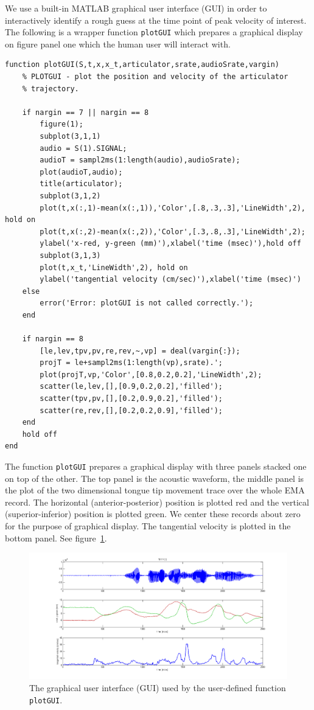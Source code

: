 \documentclass[a4paper, 12pt]{article}
\begin{document}
We use a built-in MATLAB graphical user interface (GUI) in order to interactively identify a rough guess at the time point of peak velocity of interest. The following is a wrapper function \texttt{plotGUI} which prepares a graphical display on figure panel one which the human user will interact with.
\begin{verbatim}
function plotGUI(S,t,x,x_t,articulator,srate,audioSrate,vargin)
    % PLOTGUI - plot the position and velocity of the articulator
    % trajectory.
    
    if nargin == 7 || nargin == 8
        figure(1);
        subplot(3,1,1)
        audio = S(1).SIGNAL;
        audioT = sampl2ms(1:length(audio),audioSrate);
        plot(audioT,audio);
        title(articulator); 
        subplot(3,1,2)
        plot(t,x(:,1)-mean(x(:,1)),'Color',[.8,.3,.3],'LineWidth',2), hold on
        plot(t,x(:,2)-mean(x(:,2)),'Color',[.3,.8,.3],'LineWidth',2);
        ylabel('x-red, y-green (mm)'),xlabel('time (msec)'),hold off
        subplot(3,1,3)
        plot(t,x_t,'LineWidth',2), hold on
        ylabel('tangential velocity (cm/sec)'),xlabel('time (msec)')
    else
        error('Error: plotGUI is not called correctly.');
    end
    
    if nargin == 8
        [le,lev,tpv,pv,re,rev,~,vp] = deal(vargin{:});
        projT = le+sampl2ms(1:length(vp),srate).';
        plot(projT,vp,'Color',[0.8,0.2,0.2],'LineWidth',2);
        scatter(le,lev,[],[0.9,0.2,0.2],'filled'); 
        scatter(tpv,pv,[],[0.2,0.9,0.2],'filled'); 
        scatter(re,rev,[],[0.2,0.2,0.9],'filled');
    end
    hold off
end
\end{verbatim}
The function \texttt{plotGUI} prepares a graphical display with three panels stacked one on top of the other. The top panel is the acoustic waveform, the middle panel is the plot of the two dimensional tongue tip movement trace over the whole EMA record. The horizontal (anterior-posterior) position is plotted red and the vertical (superior-inferior) position is plotted green. We center these records about zero for the purpose of graphical display. The tangential velocity is plotted in the bottom panel. See figure~\ref{fig:gui}. 
\begin{figure}
\centering
\includegraphics[width=.8\textwidth]{p1.png}
\caption{The graphical user interface (GUI) used by the user-defined function \texttt{plotGUI}.}
\label{fig:gui}
\end{figure}
\end{document}
